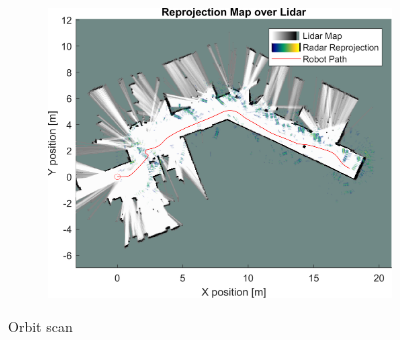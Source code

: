 \begin{figure}[htbp]
\begin{subfigure}[t]{0.475\linewidth}
    \end{subfigure}%
    \hfill%
    \begin{subfigure}[t]{0.475\linewidth}   
        \centering 
        \includegraphics[width=\linewidth,max height=.475\textheight]{gfx/results/orbit_map.png}
    \end{subfigure}%
    \caption{Orbit scan}
\end{figure}

